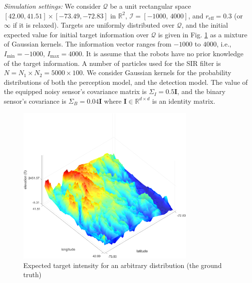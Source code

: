 \documentclass[letterpaper, 10 pt, conference]{ieeeconf}
\begin{document}
\textit{Simulation settings:}
We consider  $\mathcal{Q}$ be a unit rectangular space $[42.00,41.51]\times [-73.49,-72.83]$ in $\mathbb{R}^2$, $\mathcal{I} = [-1000,\,4000]$, and $r_{\text{eff}} =0.3$ (or $\infty$ if it is relaxed). Targets are uniformly distributed over $\mathcal{Q}$, and the initial expected value for initial target information over $\mathcal{Q}$ is given in Fig. \ref{fig:fig1} as a mixture of Gaussian kernels. The information vector ranges from $-1000$ to $4000$, i.e., $I_{\min} = -1000$, $I_{\max} = 4000$.
It is assume that the robots have no prior knowledge of the target information.
A number of particles used for the SIR filter is $N= N_1\times N_2 = 5000 \times 100$. We consider Gaussian kernels for the probability distributions of both the perception model, and the detection model. The value of the equipped noisy sensor's covariance matrix is $\Sigma_I = 0.5\mathbf{I}$, and the binary sensor's covariance is $\Sigma_B = 0.04\mathbf{I}$ where $\mathbf{I} \in \mathbb{R}^{d\times d}$ is an identity matrix.




\begin{figure}
	\centering
	\includegraphics[width=3.5in]{figure/gtruth3d}
	\caption{Expected target intensity for an arbitrary distribution (the ground truth)} 
	\label{fig:fig1}
\end{figure}

\end{document}
